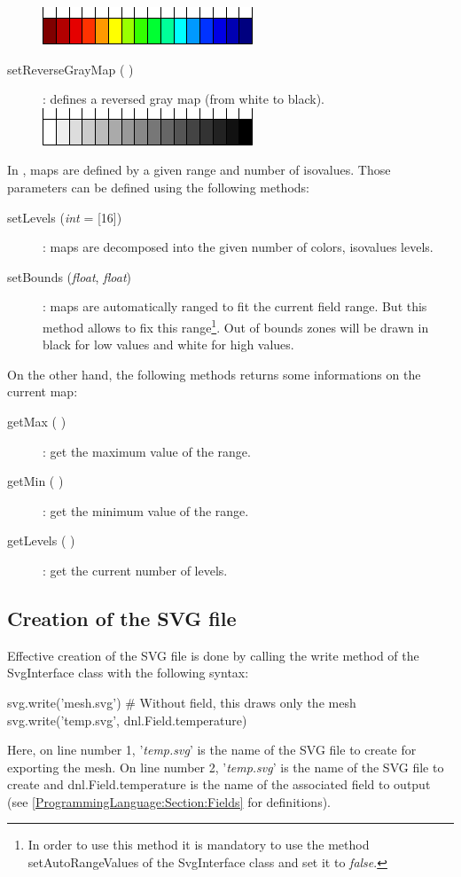 \begin{description}
 \hspace*{0.2\columnwidth}\includegraphics{Figures/ProgrammingLanguage/ReverseDeepColorMap}
\item [{setReverseGrayMap ( )}] : defines a reversed gray map (from white to black).\\
 \hspace*{0.2\columnwidth}\includegraphics{Figures/ProgrammingLanguage/ReverseGrayMap}
\end{description}

In \DynELA, maps are defined by a given range and number of isovalues. Those parameters can be defined using the following methods:
\begin{description}
\item [{setLevels (\emph{int} = [16]})] : maps are decomposed into the given number of colors, \ie isovalues levels.
\item [{setBounds (\emph{float}, \emph{float})}] : maps are automatically ranged to fit the current field range. But this method allows to fix this range\footnote{In order to use this method it is mandatory to use the method \textsf{setAutoRangeValues} of the \textsf{SvgInterface} class and set it to \emph{false}.}. Out of bounds zones will be drawn in black for low values and white for high values.
\end{description}

On the other hand, the following methods returns some informations on the current map:
\begin{description}
\item [{getMax ( )}] : get the maximum value of the range.
\item [{getMin ( )}] : get the minimum value of the range.
\item [{getLevels ( )}] : get the current number of levels.
\end{description}

\subsection{Creation of the SVG file}
Effective creation of the SVG file is done by calling the \textsf{write} method of the \textsf{SvgInterface} class with the following syntax:
\begin{PythonListing}
svg.write('mesh.svg') # Without field, this draws only the mesh
svg.write('temp.svg', dnl.Field.temperature)
\end{PythonListing}
Here, on line number 1, '\emph{temp.svg}' is the name of the SVG file to create for exporting the mesh. On line number 2, '\emph{temp.svg}' is the name of the SVG file to create and \textsf{dnl.Field.temperature} is the name of the associated field to output (see \ref{ProgrammingLanguage:Section:Fields} for definitions).

